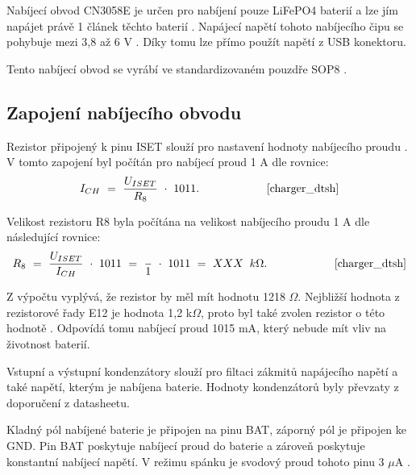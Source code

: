 Nabíjecí obvod CN3058E je určen pro nabíjení pouze LiFePO4 baterií a lze jím napájet právě 1 článek těchto baterií \cite{charger_dtsh}. Napájecí napětí tohoto 
nabíjecího čipu se pohybuje mezi 3,8 až 6 V \cite{charger_dtsh}. Díky tomu lze přímo použít napětí z USB konektoru. 



Tento nabíjecí obvod se vyrábí ve standardizovaném pouzdře SOP8 \cite{charger_dtsh}.

\subsection{Zapojení nabíjecího obvodu}
Rezistor připojený k pinu ISET slouží pro nastavení hodnoty nabíjecího proudu \cite{charger_dtsh}. V tomto zapojení byl počítán pro nabíjecí proud 1 A dle rovnice: 
\begin{equation} 
  I_{CH}~=~\frac{U_{ISET}}{R_{8}}~\cdot~1011. 
  \quad \quad \quad \quad \quad \quad \cite{charger_dtsh}
\label{eq:I_CH}
\end{equation}



Velikost rezistoru R8 byla počítána na velikost nabíjecího proudu 1 A dle následující rovnice:
\begin{equation} 
  R_{8}~=~\frac{U_{ISET}}{I_{CH}}~\cdot~1011~=~\frac{}{1}~\cdot~1011~=~XXX~\:k\Omega. 
  \quad \quad \quad \quad \quad \quad \cite{charger_dtsh}
\label{eq:I_CH}
\end{equation}


Z výpočtu vyplývá, že rezistor by měl mít hodnotu 1218 $\Omega$. Nejbližší hodnota z rezistorové řady E12 je hodnota 1,2 k$\Omega$, proto byl také zvolen rezistor 
o této hodnotě \cite{rezistorova_rada}. Odpovídá tomu nabíjecí proud 1015 mA, který nebude mít vliv na životnost baterií. 


Vstupní a výstupní kondenzátory slouží pro filtaci zákmitů napájecího napětí a také napětí, kterým je nabíjena baterie. Hodnoty kondenzátorů byly převzaty
z doporučení z datasheetu.

Kladný pól nabíjené baterie je připojen na pinu BAT, záporný pól je připojen ke GND. Pin BAT poskytuje nabíjecí proud do baterie a zároveň poskytuje konstantní 
nabíjecí napětí. V režimu spánku je svodový proud tohoto pinu 3 $\mu$A \cite{charger_dtsh}. 

